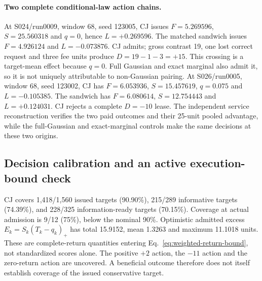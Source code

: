 \documentclass[10pt]{article}
\begin{document}
\paragraph{Two complete conditional-law action chains.}
At S024/run0009, window 68, seed 123005, CJ issues
$F=5.269596$, $S=25.560318$ and $q=0$, hence
$L=+0.269596$. The matched sandwich issues $F=4.926124$ and
$L=-0.073876$. CJ admits; gross contrast 19, one lost correct request
and three fee units produce $D=19-1-3=+15$.
This crossing is a target-mean effect because $q=0$. Full Gaussian and
exact marginal also admit it, so it is not uniquely attributable to
non-Gaussian pairing.
At S026/run0005, window 68, seed 123002, CJ has
$F=6.053936$, $S=15.457619$, $q=0.075$ and $L=-0.105385$.
The sandwich has $F=6.080614$, $S=12.754443$ and $L=+0.124031$.
CJ rejects a complete $D=-10$ lease. The independent service
reconstruction verifies the two paid outcomes and their 25-unit pooled
advantage, while the full-Gaussian and exact-marginal controls make the
same decisions at these two origins.

\subsection{Decision calibration and an active execution-bound check}
\label{sec:harth-calibration}
CJ covers 1,418/1,560 issued targets (90.90\%), 215/289 informative
targets (74.39\%), and 228/325 information-ready targets (70.15\%).
Coverage at actual admission is 9/12 (75\%), below the nominal 90\%.
Optimistic admitted excess
$E_k=S_k(T_k-q_k)_+$ has total 15.9152, mean 1.3263 and maximum
11.1018 units. These are complete-return quantities entering
Eq.~\eqref{eq:weighted-return-bound}, not standardized scores alone.
The positive $+2$ action, the $-11$ action and the zero-return action
are uncovered. A beneficial outcome therefore does not itself establish
coverage of the issued conservative target.
\end{document}
